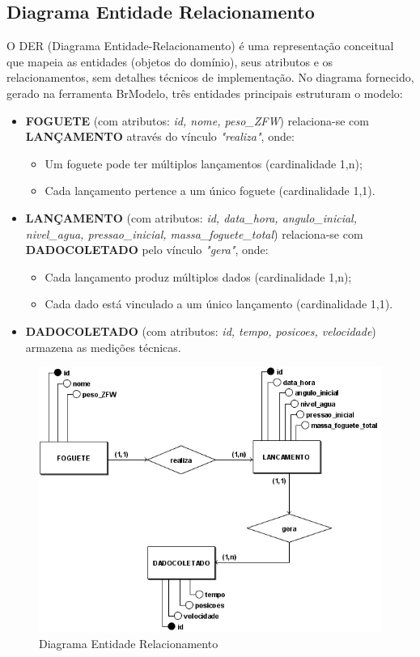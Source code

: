 \subsection{Diagrama Entidade Relacionamento}
O DER (Diagrama Entidade-Relacionamento) é uma representação conceitual que mapeia as entidades (objetos do domínio), seus atributos e os relacionamentos, sem detalhes técnicos de implementação. No diagrama fornecido, gerado na ferramenta BrModelo, três entidades principais estruturam o modelo:

\begin{itemize}
  \item \textbf{FOGUETE} (com atributos: \textit{id, nome, peso\_ZFW}) relaciona-se com \textbf{LANÇAMENTO} através do vínculo \textit{"realiza"}, onde:
  \begin{itemize}
    \item Um foguete pode ter múltiplos lançamentos (cardinalidade 1,n);
    \item Cada lançamento pertence a um único foguete (cardinalidade 1,1).
  \end{itemize}

  \item \textbf{LANÇAMENTO} (com atributos: \textit{id, data\_hora, angulo\_inicial, nivel\_agua, pressao\_inicial, massa\_foguete\_total}) relaciona-se com \textbf{DADOCOLETADO} pelo vínculo \textit{"gera"}, onde:
  \begin{itemize}
    \item Cada lançamento produz múltiplos dados (cardinalidade 1,n);
    \item Cada dado está vinculado a um único lançamento (cardinalidade 1,1).
  \end{itemize}

  \item \textbf{DADOCOLETADO} (com atributos: \textit{id, tempo, posicoes, velocidade}) armazena as medições técnicas.
\end{itemize}

\begin{figure}[H]
\centering
\includegraphics[width=0.5\linewidth]{editaveis/figuras/diagrama_EntidadeRelacionamento.png}
\caption{Diagrama Entidade Relacionamento}
\label{fig:enter-label}
\end{figure}

